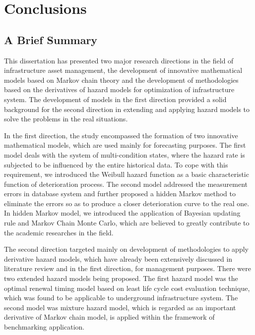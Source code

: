 
\chapter{Conclusions} %
\label{Chapter7}
\section{A Brief Summary}
This dissertation has presented two major research directions in the field of infrastructure asset management, the development of innovative mathematical models based on Markov chain theory and the development of methodologies based on the derivatives of hazard models for optimization of infrastructure system. The development of models in the first direction provided a solid background for the second direction in extending and applying hazard models to solve the problems in the real situations. 

In the first direction, the study encompassed the formation of two innovative mathematical models, which are used mainly for forecasting purposes. The first model deals with the system of multi-condition states, where the hazard rate is subjected to be influenced by the entire historical data. To cope with this requirement, we introduced the Weibull hazard function as a basic characteristic function of deterioration process. The second model addressed the measurement errors in database system and further proposed a hidden Markov method to eliminate the errors so as to produce a closer deterioration curve to the real one. In hidden Markov model, we introduced the application of Bayesian updating rule and Markov Chain Monte Carlo, which are believed to greatly contribute to the academic researches in the field.

The second direction targeted mainly on development of methodologies to apply derivative hazard models, which have already been extensively discussed in literature review and in the first direction, for management purposes. There were two extended hazard models being proposed. The first hazard model was the optimal renewal timing model based on least life cycle cost evaluation technique, which was found to be applicable to underground infrastructure system. The second model was mixture hazard model, which is regarded as an important derivative of Markov chain model, is applied within the framework of benchmarking application.

